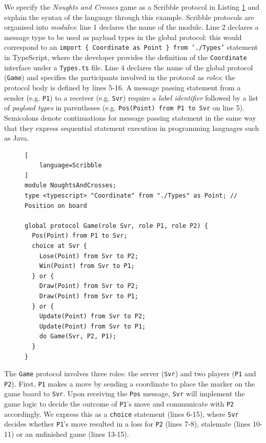 \documentclass[submission,copyright,creativecommons]{eptcs}
\begin{document}
We specify the \textit{Noughts and Crosses} game as a Scribble protocol in Listing \ref{lst:game} and explain the syntax of the language through this example. 
Scribble protocols are organised into \textit{modules}: line 1 declares the name of the module. Line 2 declares a message type to be used as payload types in the global protocol: this would correspond to an \texttt{import \{ Coordinate as Point \} from './Types'} statement in TypeScript, where the developer provides the definition of the \texttt{Coordinate} interface under a \texttt{Types.ts} file.
Line 4 declares the name of the global protocol (\texttt{Game}) and specifies the participants involved in the protocol as \textit{roles}; the protocol body is defined by lines 5-16.
A message passing statement from a sender (e.g. \texttt{P1}) to a receiver (e.g. \texttt{Svr}) require a \textit{label identifier} followed by a list of \textit{payload types} in parentheses (e.g. \texttt{Pos(Point) from P1 to Svr} on line 5).
Semicolons denote continuations for message passing statement in the same way that they express sequential statement execution in programming languages such as Java.

\begin{figure}[!h]
\begin{lstlisting}[
	language=Scribble
]
module NoughtsAndCrosses;
type <typescript> "Coordinate" from "./Types" as Point;	// Position on board

global protocol Game(role Svr, role P1, role P2) {
  Pos(Point) from P1 to Svr;
  choice at Svr {
    Lose(Point) from Svr to P2;
    Win(Point) from Svr to P1;
  } or {
    Draw(Point) from Svr to P2;
    Draw(Point) from Svr to P1;
  } or {
    Update(Point) from Svr to P2;
    Update(Point) from Svr to P1;
    do Game(Svr, P2, P1);
  }
}
\end{lstlisting}
\label{lst:game}
\end{figure}

The \texttt{Game} protocol involves three roles: the server (\texttt{Svr}) and two players (\texttt{P1} and \texttt{P2}). First, \texttt{P1} makes a move by sending a coordinate to place the marker on the game board to \texttt{Svr}. Upon receiving the \texttt{Pos} message, \texttt{Svr} will implement the game logic to decide the outcome of \texttt{P1}'s move and communicate with \texttt{P2} accordingly. We express this as a \texttt{choice} statement (lines 6-15), where \texttt{Svr} decides whether \texttt{P1}'s move resulted in a loss for \texttt{P2} (lines 7-8), stalemate (lines 10-11) or an unfinished game (lines 13-15).
\end{document}
